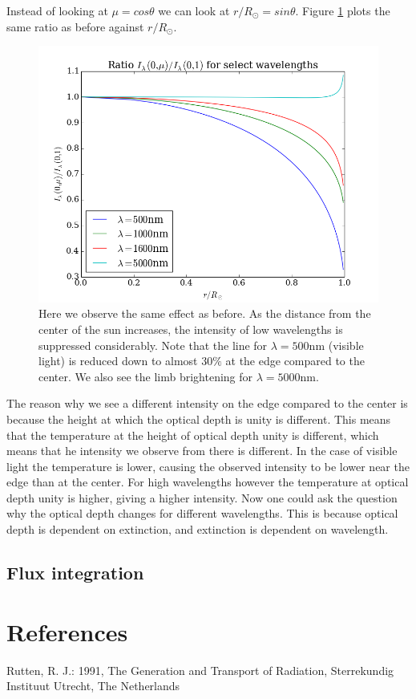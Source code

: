 \documentclass{aa}   %
\begin{document}
Instead of looking at $\mu = cos \theta$ we can look at $r/R_\odot = sin \theta$. Figure \ref{ratiointensityrRsun} plots the same ratio as before against $r/R_\odot$. 

\begin{figure}
 \includegraphics[width=.49\textwidth]{ratiointensityrRsun.png}
 \caption{Here we observe the same effect as before. As the distance from the center of the sun increases, the intensity of low wavelengths is suppressed considerably. Note that the line for $\lambda = 500$nm (visible light) is reduced down to almost $30\%$ at the edge compared to the center. We also see the limb brightening for $\lambda = 5000$nm.}
\label{ratiointensityrRsun}
\end{figure}
The reason why we see a different intensity on the edge compared to the center is because the height at which the optical depth is unity is different. This means that the temperature at the height of optical depth unity is different, which means that he intensity we observe from there is different. In the case of visible light the temperature is lower, causing the observed intensity to be lower near the edge than at the center. For high wavelengths however the temperature at optical depth unity is higher, giving a higher intensity. Now one could ask the question why the optical depth changes for different wavelengths. This is because optical depth is dependent on extinction, and extinction is dependent on wavelength. 

\subsection{Flux integration}



\section{References}
Rutten, R. J.: 1991, The Generation and Transport of Radiation, Sterrekundig Instituut Utrecht, The Netherlands

\end{document}
